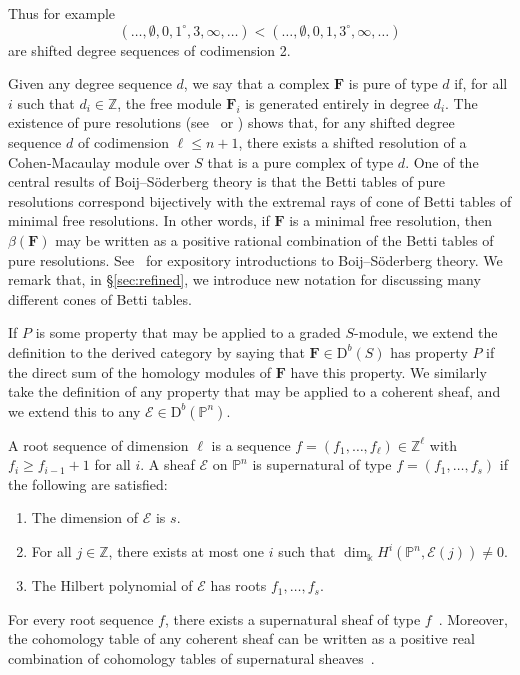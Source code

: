\documentclass[12pt]{amsart}
\theoremstyle{definition}
\theoremstyle{remark}
\newcommand{\PP}{\mathbb{P}}
\newcommand{\ZZ}{\mathbb{Z}}
\newcommand{\cE}{\mathcal{E}}
\newcommand{\FF}{\mathbf{F}}
\newcommand{\defi}[1]{\textsf{#1}} %
\newcommand{\DD}{\mathrm{D}}
\begin{document}
Thus for example
$$
(\dots, \emptyset , 0, 1^{\circ}, 3, \infty, \dots) < (\dots, \emptyset , 0, 1, 3^{\circ}, \infty, \dots) 
$$
are shifted degree sequences of codimension 2.

Given any degree sequence $d$, we say that a complex $\FF$ is \defi{pure of type $d$} if, for all $i$ such that $d_i\in \ZZ$, the free module $\FF_i$ is generated entirely in degree $d_i$.   The existence of pure resolutions (see~\cite{efw} or \cite[\S5]{eis-schrey1}) shows that, for any shifted degree sequence $d$ of codimension $\ell\leq n+1$, there exists a shifted resolution of a Cohen-Macaulay module over $S$ that is a pure complex of type $d$.  One of the central results of Boij--S\"oderberg theory is that the Betti tables of pure resolutions correspond bijectively with the extremal rays of cone of Betti tables of minimal free resolutions.  In other words, if $\FF$ is a minimal free resolution, then $\beta(\FF)$ may be written as a positive rational combination of the Betti tables of pure resolutions.  See~\cite{eis-schrey-icm,floystad-expository} for expository introductions to Boij--S\"oderberg theory.  We remark that, in \S\ref{sec:refined}, we introduce new notation for discussing many different cones of Betti tables.


If $P$ is some property that may be applied to a graded $S$-module, we extend the definition to the derived category by saying that $\FF \in \DD^b(S)$ has property $P$ if the direct sum of the homology modules of $\FF$ have this property. We similarly take the definition of any property that may be applied to a coherent sheaf, and we extend this to any $\cE\in \DD^b(\PP^n)$.  

A \defi{root sequence of dimension $\ell$} is a sequence $f=(f_1,\dots,f_\ell)\in \mathbb Z^{\ell}$ with $f_i\geq f_{i-1}+1$ for all $i$.  
A sheaf $\cE$ on $\PP^{n}$ is
\defi{supernatural of type} $f=(f_1, \dots, f_{s})$ if the following are satisfied: 
\begin{enumerate}
\item The dimension of $\cE$ is $s$.
\item For all $j\in \mathbb Z$, there exists at most one $i$ 
		such that $\dim_\Bbbk H^i(\PP^{n}, \cE(j))\ne 0$.
\item The Hilbert polynomial of $\cE$ has roots $f_1, \dots, f_{s}$.
\end{enumerate}
For every root sequence $f$, there exists a supernatural sheaf of type
$f$~\cite[Theorem~0.4]{eis-schrey1}.
Moreover, the cohomology table of any coherent sheaf 
can be written as a positive real combination of cohomology tables 
of supernatural sheaves~\cite[Theorem~0.1]{eis-schrey1}.  
\end{document}
